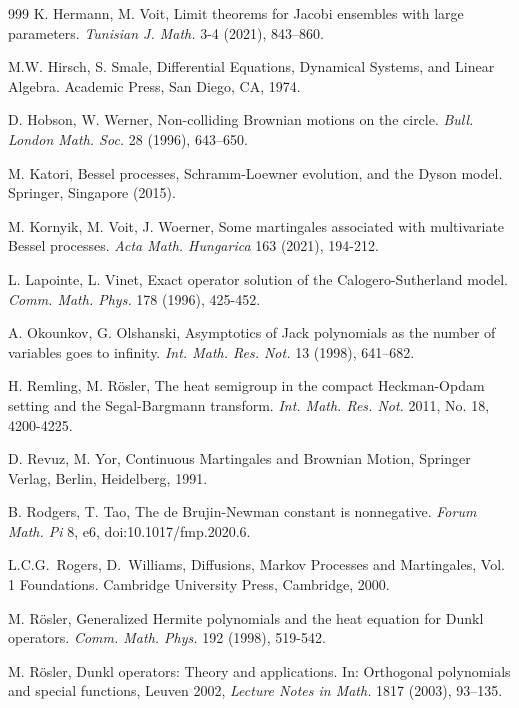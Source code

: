 \documentclass[reqno]{amsart}
\theoremstyle{plain}
\theoremstyle{definition}
\numberwithin{equation}{section}
\begin{document}
\begin{thebibliography}{999}
 K. Hermann, M. Voit, Limit theorems for Jacobi ensembles with large parameters.
  \textit{Tunisian J. Math.} 3-4 (2021), 843--860.

   M.W. Hirsch, S. Smale, Differential Equations, Dynamical Systems, and Linear Algebra.
    Academic Press, San Diego, CA, 1974.

  D. Hobson, W. Werner, Non-colliding Brownian motions on the circle.
\textit{ Bull. London Math. Soc.} 28 (1996), 643--650.   
    
 M. Katori, 
Bessel processes, Schramm-Loewner evolution, and the Dyson model.
 Springer, Singapore (2015).
  
    
    
 M. Kornyik, M. Voit, J. Woerner, Some martingales associated with
  multivariate Bessel  processes. \textit{Acta Math. Hungarica}  163  (2021),  194-212.

 

 L. Lapointe, L. Vinet, Exact operator solution of the Calogero-Sutherland model.
  \textit{Comm. Math. Phys.} 178 (1996), 425-452.
   
  A. Okounkov, G. Olshanski, Asymptotics of Jack polynomials as the number of variables goes to infinity. 
 \textit{ Int. Math. Res. Not.} 13  (1998), 641–682.


    
      H. Remling,  M. R\"osler,
  The heat semigroup in the compact Heckman-Opdam setting and the Segal-Bargmann transform. 
 \textit{ Int. Math. Res. Not.} 2011, No. 18, 4200-4225.


   D. Revuz, M. Yor, Continuous Martingales and Brownian Motion, Springer Verlag, Berlin, Heidelberg, 1991.

   B. Rodgers, T. Tao, The de Brujin-Newman constant is nonnegative. \textit{Forum Math. Pi} 8, e6, doi:10.1017/fmp.2020.6.

     L.C.G.~Rogers, D.~Williams, Diffusions, Markov Processes and Martingales, Vol. 1 Foundations.
Cambridge University Press, Cambridge, 2000.


 M. R\"osler,
Generalized Hermite polynomials and the heat equation for Dunkl operators.
\textit{Comm. Math. Phys.} 192 (1998),  519-542.


 M. R\"osler, Dunkl operators: Theory and applications.
In: Orthogonal polynomials and special functions, Leuven 2002, \textit{Lecture Notes in Math.} 1817 (2003), 93--135.


\end{thebibliography}
\end{document}
